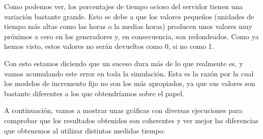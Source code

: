 \documentclass[11pt,a4paper]{report}
\begin{document}
Como podemos ver, los porcentajes de tiempo ocioso del servidor tienen una variación bastante grande. Esto se debe a que los valores pequeños (unidades de tiempo
más altas como las horas o la medias horas) producen unos valores muy próximos a cero en los generadores y, en consecuencia, son redondeados. Como ya hemos visto,
estos valores no serán devueltos como 0, si no como 1.

Con esto estamos diciendo que un suceso dura más de lo que realmente es, y vamos acumulando este error en toda la simulación. Esta es la razón por la cual los
modelos de incremento fijo no son los más apropiados, ya que sus valores son bastante diferentes a los que obtendríamos sobre el papel.

A continuación, vamos a mostrar unas gráficas con diversas ejecuciones para comprobar que los resultados obtenidos son coherentes y ver mejor las diferencias que
obtenemos al utilizar distintas medidas tiempo:
\end{document}
